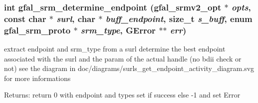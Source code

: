 \subsubsection{\setlength{\rightskip}{0pt plus 5cm}int gfal\_\-srm\_\-determine\_\-endpoint (gfal\_\-srmv2\_\-opt $\ast$ {\em opts}, const char $\ast$ {\em surl}, char $\ast$ {\em buff\_\-endpoint}, size\_\-t {\em s\_\-buff}, enum gfal\_\-srm\_\-proto $\ast$ {\em srm\_\-type}, GError $\ast$$\ast$ {\em err})}\label{gfal__common__srm__endpoint_8h_e0b7b0c302d9d514df5518cbf8b4c215}


extract endpoint and srm\_\-type from a surl determine the best endpoint associated with the surl and the param of the actual handle (no bdii check or not) see the diagram in doc/diagrams/surls\_\-get\_\-endpoint\_\-activity\_\-diagram.svg for more informations 

\begin{Desc}
\item[Returns:]return 0 with endpoint and types set if success else -1 and set Error \end{Desc}
